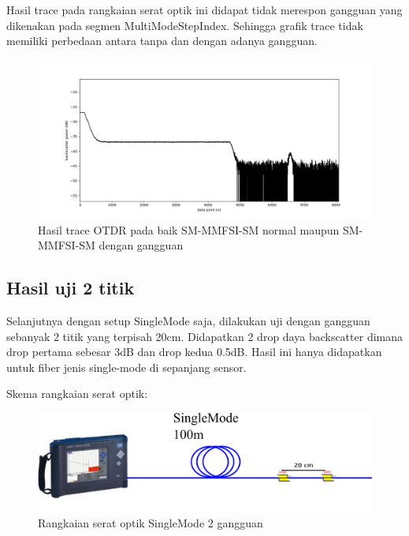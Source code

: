 \documentclass[12pt]{article}
\begin{document}
\begin{enumerate}
		Hasil trace pada rangkaian serat optik ini didapat tidak merespon gangguan yang dikenakan pada segmen MultiModeStepIndex.
		Sehingga grafik trace tidak memiliki perbedaan antara tanpa dan dengan adanya gangguan.
		
		\begin{figure}[!h]
			\centering
			\captionsetup{justification=centering}
			\includegraphics[width=\linewidth]{images/Bab_4/Bab_4_3f1}
			\caption[Trace SM-MMFSI-SM ]{\small{Hasil trace OTDR pada baik SM-MMFSI-SM  normal maupun SM-MMFSI-SM  dengan gangguan}}
		\end{figure}
	
	\end{enumerate}

	\subsection{Hasil uji 2 titik}
	
	Selanjutnya dengan setup SingleMode saja, dilakukan uji dengan gangguan sebanyak 2 titik yang terpisah 20cm.
	Didapatkan 2 drop daya backscatter dimana drop pertama sebesar 3dB dan drop kedua 0.5dB.
	Hasil ini hanya didapatkan untuk fiber jenis single-mode di sepanjang sensor.
	
	\newpage
	Skema rangkaian serat optik:
	
	\begin{figure}[!h]
		\centering
		\captionsetup{justification=centering}
		\includegraphics[width=0.7\linewidth]{images/Bab_4/sm2}
		\caption[Trace SMF-SMF]{\small{Rangkaian serat optik SingleMode 2 gangguan}}
	\end{figure}
\end{document}
